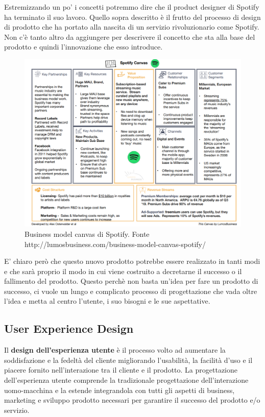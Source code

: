 Estremizzando un po' i concetti potremmo dire che il product designer di Spotify ha terminato il suo lavoro. Quello sopra descritto è il frutto del processo di design di prodotto che ha portato alla nascita di un servizio rivoluzionario come Spotify. Non c'è tanto altro da aggiungere per descrivere il concetto che sta alla base del prodotto e quindi l'innovazione che esso introduce.

\begin{figure}[!h]
	\centering
	\includegraphics[width=\textwidth]{../immagini/spotifycanvas.png}
	\caption{Business model canvas di Spotify. Fonte http://lumosbusiness.com/business-model-canvas-spotify/}
\end{figure}

E' chiaro però che questo nuovo prodotto potrebbe essere realizzato in tanti modi e che sarà proprio il modo in cui viene costruito a decretarne il successo o il fallimento del prodotto. Questo perchè non basta un'idea per fare un prodotto di successo, ci vuole un lungo e complicato processo di progettazione che vada oltre l'idea e metta al centro l'utente, i suo bisogni e le sue aspettative.

\subsection{User Experience Design}
Il \textbf{design dell'esperienza utente} è il processo volto ad aumentare la soddisfazione e la fedeltà del cliente migliorando l'usabilità, la facilità d'uso e il piacere fornito nell'interazione tra il cliente e il prodotto. La progettazione dell'esperienza utente comprende la tradizionale progettazione dell'interazione uomo-macchina e la estende integrandola con tutti gli aspetti di business, marketing e sviluppo prodotto necessari per garantire il successo del prodotto e/o servizio.

